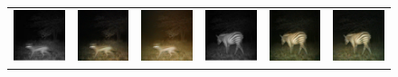 \begin{figure}[htp!]
\begin{tabularx}{\textwidth}{>{\centering\arraybackslash}X >{\centering\arraybackslash}X >{\centering\arraybackslash}X >{\centering\arraybackslash}X >{\centering\arraybackslash}X >{\centering\arraybackslash}X}
        \includegraphics{gfx/diffusion-sampling-full-vs-high-pass-filter-qual/nir_S2_B06_R1_PICT0128.jpg} & \includegraphics{gfx/diffusion-sampling-full-vs-high-pass-filter-qual/full-pass_S2_B06_R1_PICT0128.png} & \includegraphics{gfx/diffusion-sampling-full-vs-high-pass-filter-qual/high-pass_S2_B06_R1_PICT0128.png} & \includegraphics{gfx/diffusion-sampling-full-vs-high-pass-filter-qual/nir_S2_B06_R1_PICT0279.jpg} & \includegraphics{gfx/diffusion-sampling-full-vs-high-pass-filter-qual/full-pass_S2_B06_R1_PICT0279.png} & \includegraphics{gfx/diffusion-sampling-full-vs-high-pass-filter-qual/high-pass_S2_B06_R1_PICT0279.png}\\

\end{tabularx}
\end{figure}
